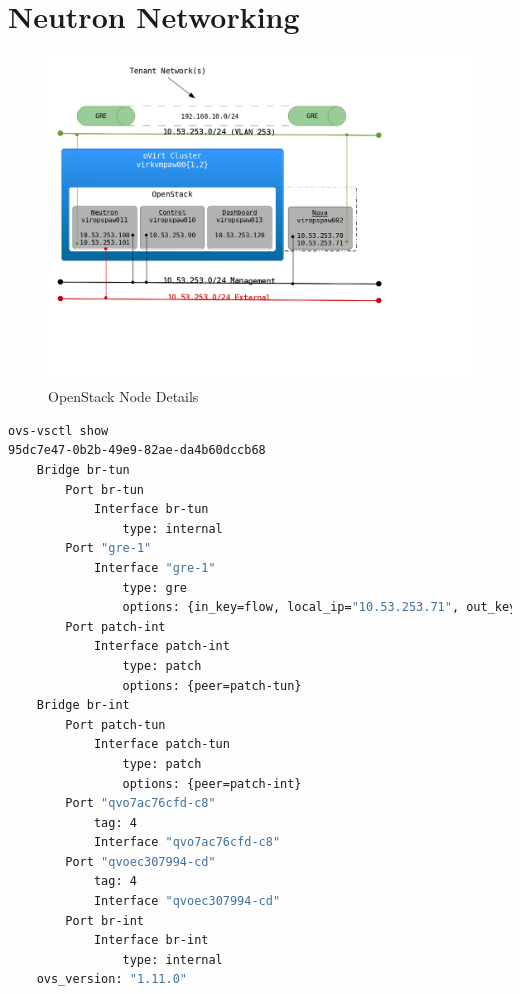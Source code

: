 \documentclass[11pt,letterpaper,oneside]{book}
\begin{document}
\section{Neutron Networking}
\begin{figure}[H]
	\caption{OpenStack Node Details}
	\centering
	\label{fig:openstack_neutron_gre}
	\includegraphics[scale=0.75]{./pictures/openstack_neutron_gre.png}
\end{figure}
\begin{lstlisting}[caption={Nova Node Open vSwtich},language=bash]
ovs-vsctl show
95dc7e47-0b2b-49e9-82ae-da4b60dccb68
    Bridge br-tun
        Port br-tun
            Interface br-tun
                type: internal
        Port "gre-1"
            Interface "gre-1"
                type: gre
                options: {in_key=flow, local_ip="10.53.253.71", out_key=flow, remote_ip="10.53.253.101"}
        Port patch-int
            Interface patch-int
                type: patch
                options: {peer=patch-tun}
    Bridge br-int
        Port patch-tun
            Interface patch-tun
                type: patch
                options: {peer=patch-int}
        Port "qvo7ac76cfd-c8"
            tag: 4
            Interface "qvo7ac76cfd-c8"
        Port "qvoec307994-cd"
            tag: 4
            Interface "qvoec307994-cd"
        Port br-int
            Interface br-int
                type: internal
    ovs_version: "1.11.0"
\end{lstlisting}
\end{document}
